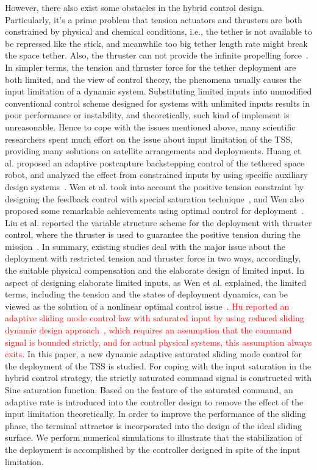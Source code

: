 \documentclass[3p]{elsarticle}
\theoremstyle{plain}
\theoremstyle{remark}
\begin{document}
However, there also exist some obstacles in the hybrid control design. Particularly, it's a prime problem that tension actuators and thrusters are both constrained by physical and chemical conditions, i.e., the tether is not available to be repressed like the stick, and meanwhile too big tether length rate might break the space tether. Also, the thruster can not provide the infinite propelling force~\cite{martinez1998spacecraft}. In simpler terms, the tension and thruster force for the tether deployment are both limited, and the view of control theory, the phenomena usually causes the input limitation of a dynamic system. Substituting limited inputs into unmodified conventional control scheme designed for systems with unlimited inputs results in poor performance or instability, and theoretically, such kind of implement is unreasonable. Hence to cope with the issues mentioned above, many scientific researchers spent much effort on the issue about input limitation of the TSS, providing many solutions on satellite arrangements and deployments. Huang et al. proposed an adaptive postcapture backstepping control of the tethered space robot, and analyzed the effect from constrained inputs by using specific auxiliary design systems~\cite{huang2015adaptive}. Wen et al. took into account the positive tension constraint by designing the feedback control with special saturation technique~\cite{wen2016constrained}, and Wen also proposed some remarkable achievements using optimal control for deployment~\cite{wen2008optimal}. Liu et al. reported the variable structure scheme for the deployment with thruster control, where the thruster is used to guarantee the positive tension during the mission~\cite{yingying2012variable}. In summary, existing studies deal with the major issue about the deployment with restricted tension and thruster force in two ways, accordingly, the suitable physical compensation and the elaborate design of limited input. In aspect of designing elaborate limited inputs, as Wen et al. explained, the limited terms, including the tension and the states of deployment dynamics, can be viewed as the solution of a nonlinear optimal control issue~\cite{wen2015tension}. \textcolor{red}{Hu reported an adaptive sliding mode control law with saturated input by using reduced sliding dynamic design approach~\cite{Hu2009Robust}, which requires an assumption that the command signal is bounded strictly, and for actual physical systems, this assumption always exits.} In this paper, a new dynamic adaptive saturated sliding mode  control for the deployment of the TSS is studied. For coping with the input saturation in the hybrid control strategy, the strictly saturated command signal is constructed with Sine saturation function. Based on the feature of the saturated command, an adaptive rate is introduced into the controller design to remove the effect of the input limitation theoretically. In order to improve the performance of the sliding phase, the terminal attractor is incorporated into the design of the ideal sliding surface. We perform numerical simulations to illustrate that the stabilization of the deployment is accomplished by the controller designed in spite of the input limitation.\par
\end{document}
